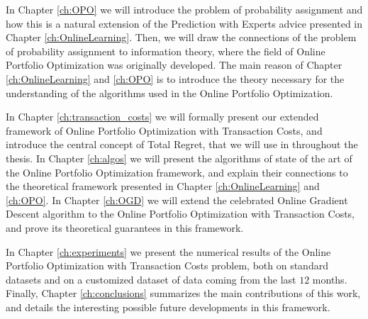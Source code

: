 In Chapter \ref{ch:OPO} we will introduce the problem of probability assignment and how this is a natural extension of the Prediction with Experts advice presented in Chapter \ref{ch:OnlineLearning}. Then, we will draw the connections of the problem of probability assignment to information theory, where the field of Online Portfolio Optimization was originally developed. The main reason of Chapter \ref{ch:OnlineLearning} and \ref{ch:OPO} is to introduce the theory necessary for the understanding of the algorithms used in the Online Portfolio Optimization.

In Chapter \ref{ch:transaction_costs} we will formally present our extended framework of Online Portfolio Optimization with Transaction Costs, and introduce the central concept of Total Regret, that we will use in throughout the thesis. In Chapter \ref{ch:algos} we will present the algorithms of  state of the art of the Online Portfolio Optimization framework, and explain their connections to the theoretical framework presented in Chapter \ref{ch:OnlineLearning} and \ref{ch:OPO}. In Chapter \ref{ch:OGD} we will extend the celebrated Online Gradient Descent algorithm to the Online Portfolio Optimization with Transaction Costs, and prove its theoretical guarantees in this framework.

In Chapter \ref{ch:experiments} we present the numerical results of the Online Portfolio Optimization with Transaction Costs problem, both on standard datasets and on a customized dataset of data coming from the last $12$ months. Finally, Chapter \ref{ch:conclusions} summarizes the main contributions of this work, and details the interesting possible future developments in this framework.
